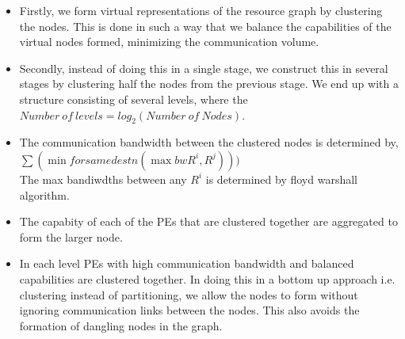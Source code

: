\begin{itemize}

\item Firstly, we form virtual representations of the resource graph by
clustering the nodes. This is done in such a way that we balance the
capabilities of the virtual nodes formed, minimizing the
communication volume.

\item Secondly, instead of doing this in a single stage, we construct
this in several stages by clustering half the nodes from the previous
stage. We end up with a structure consisting of several levels, where
the $ Number\ of\ levels = log_2 ( Number\ of\ Nodes )$.

\item The communication bandwidth between the clustered nodes is
determined by,\\ ${ \sum ( \min for same destn ( \max bw R^i, R^j ) )
) }$\\ The max bandiwdths between any ${R^i}$ is determined by floyd
warshall algorithm.

\item The capabity of each of the PEs that are clustered together are
aggregated to form the larger node.

\item In each level PEs with high communication bandwidth and balanced
capabilities are clustered together. In doing this in a bottom up
approach i.e. clustering instead of partitioning, we allow the nodes to
form without ignoring communication links between the nodes. This also
avoids the formation of dangling nodes in the graph.

\end{itemize}

